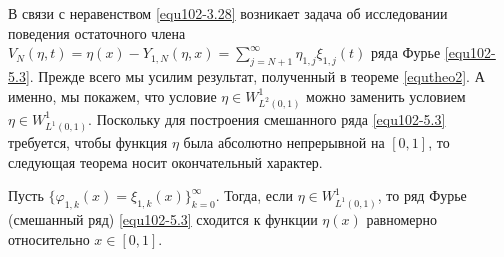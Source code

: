  В связи с неравенством \eqref{equ102-3.28} возникает задача об исследовании поведения остаточного члена $ V_N(\eta,t)=\eta(x)- Y_{1,N}(\eta,x)
=\sum\nolimits_{j=N+1}^\infty \hat \eta_{1,j}\xi_{1,j}(t)$  ряда Фурье \eqref{equ102-5.3}. Прежде всего мы усилим результат, полученный в теореме \ref{equtheo2}. А именно, мы покажем, что  условие $\eta\in W^1_{L^2(0,1)}$ можно заменить условием $\eta\in W^1_{L^1(0,1)}$. Поскольку для построения смешанного ряда \eqref{equ102-5.3} требуется, чтобы функция $\eta$ была абсолютно непрерывной на $[0,1]$, то следующая теорема носит окончательный характер.
\begin{theorem}\label{equtheo5}
 Пусть $\{\varphi_{1,k}(x)=\xi_{1,k}(x)\}_{k=0}^\infty$. Тогда, если $\eta\in W^1_{L^1(0,1)}$, то ряд Фурье (смешанный ряд) \eqref{equ102-5.3} сходится к функции $\eta(x)$ равномерно относительно $x\in[0,1]$.
 \end{theorem}

